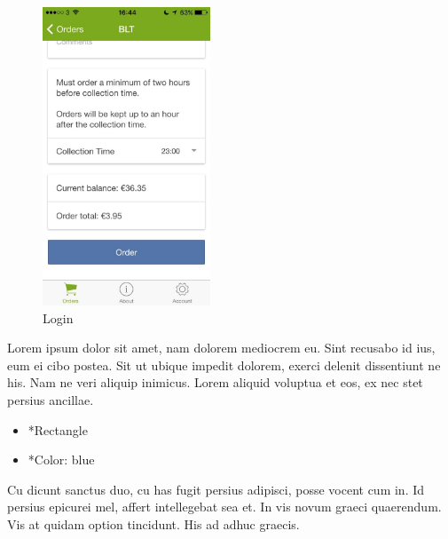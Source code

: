 \begin{minipage}{5cm}
	\begin{figure}[H]
		\includegraphics[width=5cm]{img/mobile-app/screen-shots/IMG_2909.jpg}
		\caption{Login}
	\end{figure}
\end{minipage} \hfill
\begin{minipage}{0.55\textwidth}
	Lorem ipsum dolor sit amet, nam dolorem mediocrem eu. Sint recusabo id ius, eum ei cibo postea. Sit ut ubique impedit dolorem, exerci delenit dissentiunt ne his. Nam ne veri aliquip inimicus. Lorem aliquid voluptua et eos, ex nec stet persius ancillae.
	\begin{itemize}
		\item *Rectangle
		\item *Color: blue
	\end{itemize}
	Cu dicunt sanctus duo, cu has fugit persius adipisci, posse vocent cum in. Id persius epicurei mel, affert intellegebat sea et. In vis novum graeci quaerendum. Vis at quidam option tincidunt. His ad adhuc graecis.
\end{minipage}

